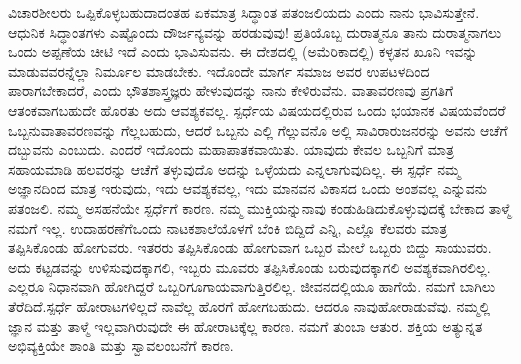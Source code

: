 ವಿಚಾರಶೀಲರು ಒಪ್ಪಿಕೊಳ್ಳಬಹುದಾದಂತಹ ಏಕಮಾತ್ರ ಸಿದ್ಧಾಂತ ಪತಂಜಲಿಯದು ಎಂದು ನಾನು ಭಾವಿಸುತ್ತೇನೆ. ಆಧುನಿಕ ಸಿದ್ಧಾಂತಗಳು ಎಷ್ಟೊಂದು ದೌರ್ಜನ್ಯವನ್ನು ಹರಡುವುವು! ಪ್ರತಿಯೊಬ್ಬ ದುರಾತ್ಮನೂ ತಾನು ದುರಾತ್ಮನಾಗಲು ಒಂದು ಅಪ್ಪಣೆಯ ಚೀಟಿ ಇದೆ ಎಂದು ಭಾವಿಸುವನು. ಈ ದೇಶದಲ್ಲಿ (ಅಮೆರಿಕಾದಲ್ಲಿ) ಕಳ್ಳತನ ಖೂನಿ ಇವನ್ನು ಮಾಡುವವರನ್ನೆಲ್ಲಾ ನಿರ್ಮೂಲ ಮಾಡಬೇಕು. ಇದೊಂದೇ ಮಾರ್ಗ ಸಮಾಜ ಅವರ ಉಪಟಳದಿಂದ ಪಾರಾಗಬೇಕಾದರೆ, ಎಂದು ಭೌತಶಾಸ್ತ್ರಜ್ಞರು ಹೇಳುವುದನ್ನು ನಾನು ಕೇಳಿರುವೆನು. ವಾತಾವರಣವು ಪ್ರಗತಿಗೆ ಆತಂಕವಾಗಬಹುದೇ ಹೊರತು ಅದು ಆವಶ್ಯಕವಲ್ಲ. ಸ್ಪರ್ಧೆಯ ವಿಷಯದಲ್ಲಿರುವ ಒಂದು ಭಯಾನಕ ವಿಷಯವೆಂದರೆ ಒಬ್ಬನು\break ವಾತಾವರಣವನ್ನು ಗೆಲ್ಲಬಹುದು, ಆದರೆ ಒಬ್ಬನು ಎಲ್ಲಿ ಗೆಲ್ಲುವನೊ ಅಲ್ಲಿ ಸಾವಿರಾರು\break ಜನರನ್ನು ಅವನು ಆಚೆಗೆ ದಬ್ಬುವನು ಎಂಬುದು. ಎಂದರೆ ಇದೊಂದು ಮಹಾಪಾತಕ\-ವಾಯಿತು. ಯಾವುದು ಕೇವಲ ಒಬ್ಬನಿಗೆ ಮಾತ್ರ ಸಹಾಯಮಾಡಿ ಹಲವರನ್ನು ಆಚೆಗೆ ತಳ್ಳುವುದೊ ಅದನ್ನು ಒಳ್ಳೆಯದು ಎನ್ನಲಾಗುವುದಿಲ್ಲ. ಈ ಸ್ಪರ್ಧೆ ನಮ್ಮ ಅಜ್ಞಾನದಿಂದ ಮಾತ್ರ ಇರುವುದು, ಇದು ಆವಶ್ಯಕವಲ್ಲ, ಇದು ಮಾನವನ ವಿಕಾಸದ ಒಂದು ಅಂಶವಲ್ಲ ಎನ್ನುವನು ಪತಂಜಲಿ. ನಮ್ಮ ಅಸಹನೆಯೇ ಸ್ಪರ್ಧೆಗೆ ಕಾರಣ. ನಮ್ಮ ಮುಕ್ತಿಯನ್ನು\break ನಾವು ಕಂಡುಹಿಡಿದುಕೊಳ್ಳುವುದಕ್ಕೆ ಬೇಕಾದ ತಾಳ್ಮೆ ನಮಗೆ ಇಲ್ಲ. ಉದಾಹರಣೆಗೆ\break ಒಂದು ನಾಟಕಶಾಲೆಯೊಳಗೆ ಬೆಂಕಿ ಬಿದ್ದಿದೆ ಎನ್ನಿ, ಎಲ್ಲೊ ಕೆಲವರು ಮಾತ್ರ ತಪ್ಪಿಸಿಕೊಂಡು ಹೋಗುವರು. ಇತರರು ತಪ್ಪಿಸಿಕೊಂಡು ಹೋಗುವಾಗ ಒಬ್ಬರ ಮೇಲೆ ಒಬ್ಬರು ಬಿದ್ದು ಸಾಯುವರು. ಅದು ಕಟ್ಟಡವನ್ನು ಉಳಿಸುವುದಕ್ಕಾಗಲಿ, ಇಬ್ಬರು ಮೂವರು ತಪ್ಪಿಸಿಕೊಂಡು ಬರುವುದಕ್ಕಾಗಲಿ ಅವಶ್ಯಕವಾಗಿರಲಿಲ್ಲ. ಎಲ್ಲರೂ ನಿಧಾನವಾಗಿ ಹೋಗಿದ್ದರೆ ಒಬ್ಬರಿಗೂ\break ಗಾಯವಾಗುತ್ತಿರಲಿಲ್ಲ. ಜೀವನದಲ್ಲಿಯೂ ಹಾಗೆಯೆ. ನಮಗೆ ಬಾಗಿಲು ತೆರೆದಿದೆ.\break ಸ್ಪರ್ಧೆ ಹೋರಾಟಗಳಿಲ್ಲದೆ ನಾವೆಲ್ಲ ಹೊರಗೆ ಹೋಗಬಹುದು. ಆದರೂ ನಾವು\break ಹೋರಾಡುವೆವು. ನಮ್ಮಲ್ಲಿ ಜ್ಞಾನ ಮತ್ತು ತಾಳ್ಮೆ ಇಲ್ಲವಾಗಿರುವುದೇ ಈ ಹೋರಾಟಕ್ಕೆಲ್ಲ ಕಾರಣ. ನಮಗೆ ತುಂಬಾ ಆತುರ. ಶಕ್ತಿಯ ಅತ್ಯುನ್ನತ ಅಭಿವ್ಯಕ್ತಿಯೇ ಶಾಂತಿ ಮತ್ತು ಸ್ವಾವಲಂಬನೆಗೆ ಕಾರಣ.

